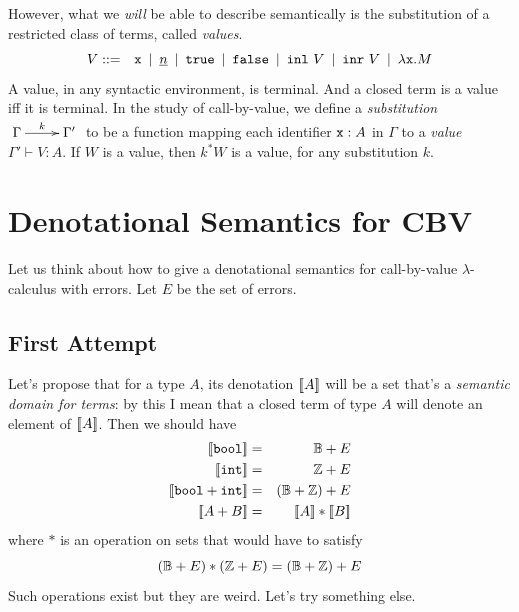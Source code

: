 \documentclass[runningheads,12pt]{llncs}
\begin{document}
However, what we \emph{will} be able to describe semantically is the substitution of a restricted class of terms, called \emph{values}.
\begin{displaymath}
  V ::=\hspace{0.7em} \mathtt{x} \hspace{0.5em} | \hspace{0.5em} \underline{n} \hspace{0.5em} | \hspace{0.5em} \mathtt{true} \hspace{0.5em} | \hspace{0.5em} \mathtt{false} \hspace{0.5em} | \hspace{0.5em} \mathtt{inl} \  {V} \hspace{0.5em} | \hspace{0.5em} \mathtt{inr} \  {V} \hspace{0.5em} | \hspace{0.5em} \lambda \mathtt{x}. M 
\end{displaymath}
A value, in any syntactic environment, is terminal.  And a closed term is a value iff it is terminal.   In the study of call-by-value, we define a \emph{substitution} $\amorphism{k}{\Gamma}{\Gamma'}$ to be a function mapping each identifier $\mathtt{x}:A$ in $\Gamma$ to a \emph{value} $\Gamma' \vdash V : A$.   If $W$ is a value, then $k^{*}W$ is a value, for any substitution $k$.   

\section{Denotational Semantics for CBV}

Let us think about how to give a denotational semantics for call-by-value $\lambda$-calculus with errors.  Let $E$ be the set of errors.  




 \subsection{First Attempt}

 Let's propose that for a type $A$, its denotation $[\![ {A} ]\!]$ will be a set that's a \emph{semantic domain for terms}: by this I mean that a closed term of type $A$ will denote an element of $[\![ {A} ]\!]$.  Then we should have
\begin{eqnarray*}
   \seman{\ttbool} & = & \bool  + E\\
  \seman{\ttint} & = & \integ + E \\
  \seman{\ttbool + \ttint} & = & (\bool + \integ)   + E \\
  \seman{A + B} & = & \seman{A} * \seman{B}
 \end{eqnarray*}
where $*$ is an operation on sets that would have to satisfy
\begin{displaymath}
  (\mathbb{B} + E) * (\mathbb{Z} + E) = (\mathbb{B} + \mathbb{Z}) + E
\end{displaymath}
Such operations exist but they are weird.  Let's try something else.

\end{document}
